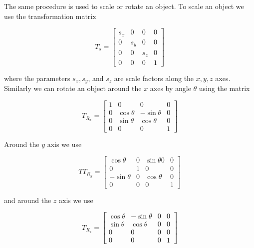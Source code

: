 The same procedure is used to scale or rotate an object. To scale an object we use the transformation matrix

\begin{equation}\label{eq:3.9}
T_s = \left[\begin{array}{cccc}
s_x & 0 & 0 & 0 \\
0 & s_y & 0 & 0 \\
0 & 0 & s_z & 0 \\
0 & 0 & 0 & 1
\end{array}\right]
\end{equation}


\noindent where the parameters $s_x, s_y$, and $s_z$ are scale factors along the $x, y, z$ axes. Similarly we can rotate an object around the $x$ axes by angle $\theta$ using the matrix

\begin{equation}\label{eq:3.10}
T_{R_x} = \left[\begin{array}{cccc}
1 & 0 & 0 & 0 \\
0 & \cos\theta & -\sin\theta & 0 \\
0 & \sin\theta & \cos\theta & 0 \\
0 & 0 & 0 & 1
\end{array}\right]
\end{equation}


\noindent Around the $y$ axis we use

\begin{equation}\label{eq:3.11}
TT_{R_y} = \left[\begin{array}{cccc}
\cos\theta & 0 & \sin\theta0 & 0 \\
0 & 1 & 0 & 0 \\
-\sin\theta & 0 & \cos\theta & 0 \\
0 & 0 & 0 & 1
\end{array}\right]
\end{equation}

\noindent and around the $z$ axis we use

\begin{equation}\label{eq:3.12}
T_{R_z} = \left[\begin{array}{cccc}
\cos\theta & -\sin\theta & 0 & 0 \\
\sin\theta & \cos\theta & 0 & 0 \\
0 & 0 & 0 & 0 \\
0 & 0 & 0 & 1
\end{array}\right]
\end{equation}

